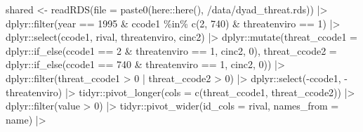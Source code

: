\documentclass[
  12,
  letterpaper,
  DIV=11,
  numbers=noendperiod]{scrartcl}
\newenvironment{Shaded}{\begin{snugshade}}{\end{snugshade}}
\newcommand{\AttributeTok}[1]{\textcolor[rgb]{0.40,0.45,0.13}{#1}}
\newcommand{\DecValTok}[1]{\textcolor[rgb]{0.68,0.00,0.00}{#1}}
\newcommand{\FunctionTok}[1]{\textcolor[rgb]{0.28,0.35,0.67}{#1}}
\newcommand{\NormalTok}[1]{\textcolor[rgb]{0.00,0.23,0.31}{#1}}
\newcommand{\OtherTok}[1]{\textcolor[rgb]{0.00,0.23,0.31}{#1}}
\newcommand{\SpecialCharTok}[1]{\textcolor[rgb]{0.37,0.37,0.37}{#1}}
\newcommand{\StringTok}[1]{\textcolor[rgb]{0.13,0.47,0.30}{#1}}
\begin{document}
\begin{Shaded}
\begin{Highlighting}[numbers=left,,]
\NormalTok{shared }\OtherTok{\textless{}{-}} \FunctionTok{readRDS}\NormalTok{(}\AttributeTok{file =} \FunctionTok{paste0}\NormalTok{(here}\SpecialCharTok{::}\FunctionTok{here}\NormalTok{(), }\StringTok{\textquotesingle{}/data/dyad\_threat.rds\textquotesingle{}}\NormalTok{)) }\SpecialCharTok{|\textgreater{}}
\NormalTok{  dplyr}\SpecialCharTok{::}\FunctionTok{filter}\NormalTok{(year }\SpecialCharTok{==} \DecValTok{1995} \SpecialCharTok{\&}\NormalTok{ ccode1 }\SpecialCharTok{\%in\%} \FunctionTok{c}\NormalTok{(}\DecValTok{2}\NormalTok{, }\DecValTok{740}\NormalTok{) }\SpecialCharTok{\&}\NormalTok{ threatenviro }\SpecialCharTok{==} \DecValTok{1}\NormalTok{) }\SpecialCharTok{|\textgreater{}}
\NormalTok{  dplyr}\SpecialCharTok{::}\FunctionTok{select}\NormalTok{(ccode1, rival, threatenviro, cinc2) }\SpecialCharTok{|\textgreater{}}
\NormalTok{  dplyr}\SpecialCharTok{::}\FunctionTok{mutate}\NormalTok{(}\AttributeTok{threat\_ccode1 =}\NormalTok{ dplyr}\SpecialCharTok{::}\FunctionTok{if\_else}\NormalTok{(ccode1 }\SpecialCharTok{==} \DecValTok{2} \SpecialCharTok{\&}\NormalTok{ threatenviro }\SpecialCharTok{==} \DecValTok{1}\NormalTok{, cinc2, }\DecValTok{0}\NormalTok{),}
                \AttributeTok{threat\_ccode2 =}\NormalTok{ dplyr}\SpecialCharTok{::}\FunctionTok{if\_else}\NormalTok{(ccode1 }\SpecialCharTok{==} \DecValTok{740} \SpecialCharTok{\&}\NormalTok{ threatenviro }\SpecialCharTok{==} \DecValTok{1}\NormalTok{, cinc2, }\DecValTok{0}\NormalTok{)) }\SpecialCharTok{|\textgreater{}}
\NormalTok{  dplyr}\SpecialCharTok{::}\FunctionTok{filter}\NormalTok{(threat\_ccode1 }\SpecialCharTok{\textgreater{}} \DecValTok{0} \SpecialCharTok{|}\NormalTok{ threat\_ccode2 }\SpecialCharTok{\textgreater{}} \DecValTok{0}\NormalTok{) }\SpecialCharTok{|\textgreater{}}
\NormalTok{  dplyr}\SpecialCharTok{::}\FunctionTok{select}\NormalTok{(}\SpecialCharTok{{-}}\NormalTok{ccode1, }\SpecialCharTok{{-}}\NormalTok{threatenviro) }\SpecialCharTok{|\textgreater{}}
\NormalTok{  tidyr}\SpecialCharTok{::}\FunctionTok{pivot\_longer}\NormalTok{(}\AttributeTok{cols =} \FunctionTok{c}\NormalTok{(threat\_ccode1, threat\_ccode2)) }\SpecialCharTok{|\textgreater{}}
\NormalTok{  dplyr}\SpecialCharTok{::}\FunctionTok{filter}\NormalTok{(value }\SpecialCharTok{\textgreater{}} \DecValTok{0}\NormalTok{) }\SpecialCharTok{|\textgreater{}}
\NormalTok{  tidyr}\SpecialCharTok{::}\FunctionTok{pivot\_wider}\NormalTok{(}\AttributeTok{id\_cols =}\NormalTok{ rival, }\AttributeTok{names\_from =}\NormalTok{ name) }\SpecialCharTok{|\textgreater{}}

\end{Highlighting}
\end{Shaded}
\end{document}
